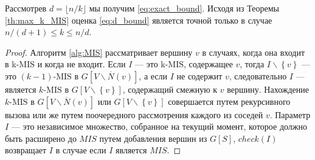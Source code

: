 \documentclass[12pt]{article}
\begin{document}
Рассмотрев $d = \lfloor n/k \rfloor$ мы получим \eqref{eq:exact_bound}. Исходя из Теоремы \ref{th:max_k_MIS} оценка \eqref{eq:d_bound} является точной только в случае $n/\left(d + 1\right) \leq k \leq n / d$.
\begin{proof}
Алгоритм \ref{alg:MIS} рассматривает вершину $v$ в случаях, когда она входит в k-$\text{MIS}$ и когда не входит. Если $I$ --- это k-$\text{MIS}$, содержащее $v$, тогда $I\backslash \left\{v\right\}$ --- это $\left(k-1\right)$-$\text{MIS}$ в $G\left[V \backslash \overline{N}\left(v\right)\right]$, а если $I$ не содержит $v$, следовательно $I$ --- является $k$-$\text{MIS}$ в $G\left[V\backslash \left\{v\right\}\right]$, содержащий смежную к $v$ вершину. Нахождение $k$-$\text{MIS}$ в $G\left[V \backslash \overline{N}\left(v\right)\right]$ или $G\left[V\backslash \left\{v\right\}\right]$ совершается путем рекурсивного вызова или же путем поочередного рассмотрения каждого из соседей $v$. Параметр $I$ --- это независимое множество, собранное на текущий момент, которое должно быть расширено до $MIS$ путем добавления вершин из $G\left[S\right]$, $check\left(I\right)$ возвращает $I$ в случае если $I$ является $MIS$.


\end{proof}
\end{document}
